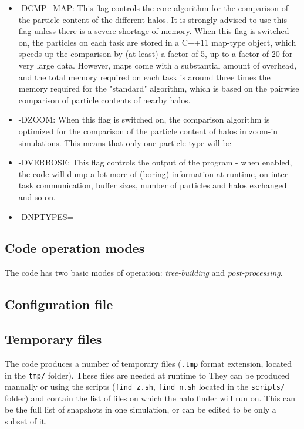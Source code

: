 \documentclass{article}
\begin{document}
\begin{itemize}
\item {-DCMP_MAP}: This flag controls the core algorithm for the comparison of the particle content of the different halos.
It is strongly advised to use this flag unless there is a severe shortage of memory. When this flag is switched on, the particles
on each task are stored in a C++11 map-type object, which speeds up the comparison by (at least) a factor of 5, up to a factor of
20 for very large data. 
However, maps come with a substantial amount of overhead, and the total memory required on each task is around three times the 
memory required for the "standard" algorithm, which is based on the pairwise comparison of particle contents of nearby halos.

\item {-DZOOM}: When this flag is switched on, the comparison algorithm is optimized for the comparison of the 
particle content of halos in zoom-in simulations. This means that only one particle type will be

\item {-DVERBOSE}: This flag controls the output of the program - when enabled, the code will dump a lot more of 
(boring) information at runtime, on inter-task communication, buffer sizes, number of particles and halos exchanged and so on.

\item {-DNPTYPES=}

\end{itemize}

\subsection{Code operation modes}

The code has two basic modes of operation: \emph{tree-building} and \emph{post-processing}.

\subsection{Configuration file}
\subsection{Temporary files}

The code produces a number of temporary files (\texttt{.tmp} format extension, located in the \texttt{tmp/} folder).
These files are needed at runtime to 
They can be produced manually or using the scripts (\texttt{find\_z.sh}, \texttt{find\_n.sh} located in the \texttt{scripts/} folder)
and contain the list of files on which the halo finder will run on.
This can be the full list of snapshots in one simulation, or can be edited to be only a subset of it.
\end{document}
